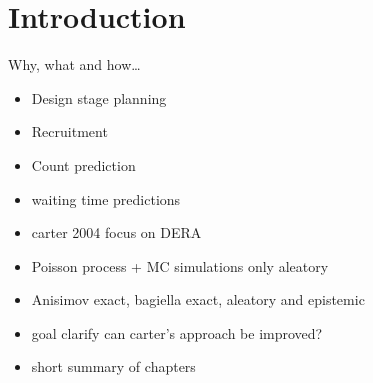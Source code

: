 


\chapter{Introduction}

Why, what and how\dots

\begin{itemize}
\item Design stage planning
\item Recruitment
\item Count prediction
\item waiting time predictions
\item carter 2004 focus on DERA
\item Poisson process + MC simulations only aleatory
\item Anisimov exact, bagiella exact, aleatory and epistemic
\item goal clarify can carter's approach be improved?
\item short summary of chapters
\end{itemize}


